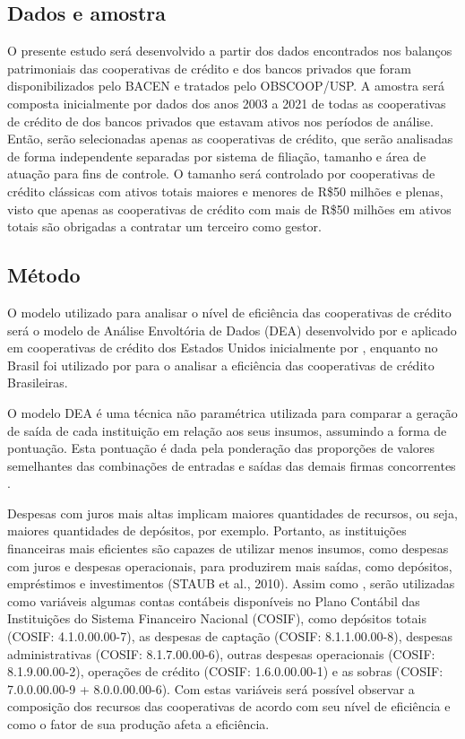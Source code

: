 \documentclass[ppgcc]{fearp}
\begin{document}
\subsection{Dados e amostra}

O presente estudo será desenvolvido a partir dos dados encontrados nos balanços patrimoniais das cooperativas de crédito e dos bancos privados que foram disponibilizados pelo BACEN e tratados pelo OBSCOOP/USP. A amostra será composta inicialmente por dados dos anos 2003 a 2021 de todas as cooperativas de crédito de dos bancos privados que estavam ativos nos períodos de análise. Então, serão selecionadas apenas as cooperativas de crédito, que serão analisadas de forma independente separadas por sistema de filiação, tamanho e área de atuação para fins de controle. O tamanho será controlado por cooperativas de crédito clássicas com ativos totais maiores e menores de R\$50 milhões e plenas, visto que apenas as cooperativas de crédito com mais de R\$50 milhões em ativos totais são obrigadas a contratar um terceiro como gestor.

\subsection{Método}

O modelo utilizado para analisar o nível de eficiência das cooperativas de crédito será o  modelo de Análise Envoltória de Dados (DEA) desenvolvido por  e aplicado em cooperativas de crédito dos Estados Unidos inicialmente por , enquanto no Brasil foi utilizado por  para o analisar a eficiência das cooperativas de crédito Brasileiras.

O modelo DEA é uma técnica não paramétrica utilizada para comparar a geração de saída de cada instituição em relação aos seus insumos, assumindo a forma de pontuação. Esta pontuação é dada pela ponderação das proporções de valores semelhantes das combinações de entradas e saídas das demais firmas concorrentes \cite{bittencourtbressan2018}.

Despesas com juros mais altas implicam maiores quantidades de recursos, ou seja, maiores quantidades de depósitos, por exemplo. Portanto, as instituições financeiras mais eficientes são capazes de utilizar menos insumos, como despesas com juros e despesas operacionais, para produzirem mais saídas, como depósitos, empréstimos e investimentos (STAUB et al., 2010).  
Assim como , serão utilizadas como variáveis algumas contas contábeis disponíveis no Plano Contábil das Instituições do Sistema Financeiro Nacional (COSIF), como depósitos totais (COSIF: 4.1.0.00.00-7), as despesas de captação (COSIF: 8.1.1.00.00-8), despesas administrativas (COSIF: 8.1.7.00.00-6), outras despesas operacionais (COSIF: 8.1.9.00.00-2), operações de crédito (COSIF: 1.6.0.00.00-1) e as sobras (COSIF: 7.0.0.00.00-9 + 8.0.0.00.00-6). Com estas variáveis será possível observar a composição dos recursos das cooperativas de acordo com seu nível de eficiência e como o fator de sua produção afeta a eficiência.
\end{document}
